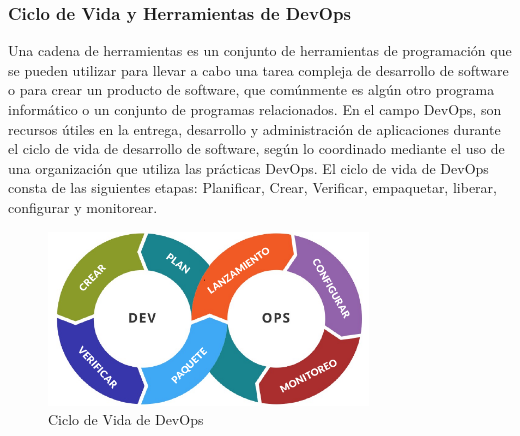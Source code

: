 \documentclass[preprint,12pt]{elsarticle}
\begin{document}
\subsubsection{\textbf{Ciclo de Vida y Herramientas de DevOps}}
Una cadena de herramientas es un conjunto de herramientas de programación que se pueden utilizar para llevar a cabo una tarea compleja de desarrollo de software o para crear un producto de software, que comúnmente es algún otro programa informático o un conjunto de programas relacionados. En el campo DevOps, son recursos útiles en la entrega, desarrollo y administración de aplicaciones durante el ciclo de vida de desarrollo de software, según lo coordinado mediante el uso de una organización que utiliza las prácticas DevOps.\cite{Perez2018} 
El ciclo de vida de DevOps consta de las siguientes etapas: Planificar, Crear, Verificar, empaquetar, liberar, configurar y monitorear. \cite{Platzi2019}   
\begin{figure}[htb]
	\begin{center}
		\includegraphics[width=8.5cm]{./IMAGENES/ciclo_devops} 
		\caption{Ciclo de Vida de DevOps}
	\end{center}
\end{figure}
\end{document}
